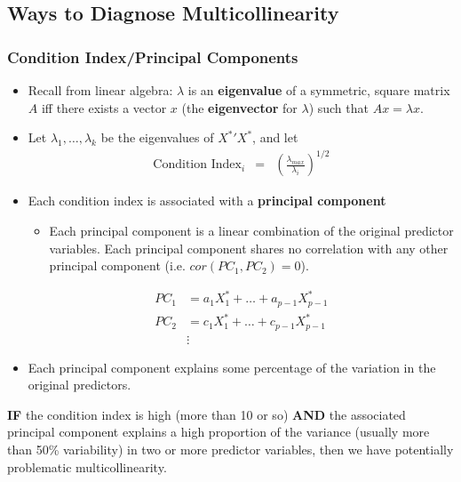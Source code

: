 \documentclass[12pt]{notes}
\begin{document}
\subsection{Ways to Diagnose Multicollinearity}
\subsubsection{Condition Index/Principal Components}
\begin{itemize}
  \item Recall from linear algebra:  $\lambda$ is an {\bf eigenvalue} of a
symmetric, square matrix ${A}$ iff there exists a vector ${x}$ (the
{\bf eigenvector} for $\lambda$)
such that ${A} {x} = \lambda {x}$.
  \item Let $\lambda_1, \ldots, \lambda_k$ be the eigenvalues of ${X^*}'
{X^*}$, and let
\begin{eqnarray}
  \text{Condition Index}_i & = & \left( \frac{\lambda_{max}}{\lambda_i} \right)^{1/2} \nonumber
\end{eqnarray}
\item Each condition index is associated with a \textbf{principal component}
\begin{itemize}
\item Each principal component is a linear combination of the original predictor variables. Each principal component shares no correlation with any other principal component (i.e. $ cor({PC_1}, {PC_2}) =  0$).
\end{itemize}
\begin{align*}
 {PC_1} & =  a_1 {X^*_1} + \ldots + a_{p-1} {X^*_{p-1}} \\
 {PC_2} & =  c_1 {X^*_1} + \ldots + c_{p-1} {X^*_{p-1}}  \\
 &\vdots
\end{align*}
\item Each principal component explains some percentage of the variation in the original predictors. 
\end{itemize}

\begin{center}
\textbf{IF} the condition index is high (more than 10 or so) \textbf{AND} the associated principal component explains a high proportion of the variance (usually more than 50\% variability) in two or more predictor variables, then we have potentially problematic multicollinearity. 
\end{center}
\end{document}
